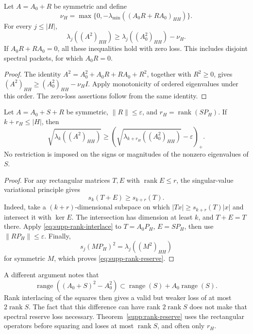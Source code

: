 \begin{proposition}
\label{supp:anticommutator}
Let $A=A_0+R$ be symmetric and define
\[
 \nu_H=\max\{0,-\lambda_{\min}((A_0R+RA_0)_{HH})\}.
\]
For every $j\le|H|$,
\[
 \lambda_j((A^2)_{HH})\ge
       \lambda_j((A_0^2)_{HH})-\nu_H.
\]
If $A_0R+RA_0=0$, all these inequalities hold with zero loss.
This includes disjoint spectral packets, for which $A_0R=0$.
\end{proposition}
\begin{proof}
The identity $A^2=A_0^2+A_0R+RA_0+R^2$, together with
$R^2\ge0$, gives $(A^2)_{HH}\ge(A_0^2)_{HH}-\nu_HI$.
Apply monotonicity of ordered eigenvalues under this order.
The zero-loss assertions follow from the same identity.
\end{proof}

\begin{theorem}
\label{supp:rank-reserve}
Let $A=A_0+S+R$ be symmetric, $\|R\|\le\varepsilon$, and
$r_H=\operatorname{rank}(SP_H)$.  If $k+r_H\le|H|$, then
\begin{equation}\label{eq:supp-rank-reserve}
 \sqrt{\lambda_k((A^2)_{HH})}\ge
 \left(\sqrt{\lambda_{k+r_H}((A_0^2)_{HH})}
                                  -\varepsilon\right)_+.
\end{equation}
No restriction is imposed on the signs or magnitudes of the
nonzero eigenvalues of $S$.
\end{theorem}
\begin{proof}
For any rectangular matrices $T,E$ with $\operatorname{rank}E\le r$,
the singular-value variational principle gives
\begin{equation}\label{eq:supp-rank-interlace}
 s_k(T+E)\ge s_{k+r}(T).
\end{equation}
Indeed, take a $(k+r)$-dimensional subspace on which
$|Tx|\ge s_{k+r}(T)|x|$ and intersect it with $\ker E$.
The intersection has dimension at least $k$, and $T+E=T$ there.
Apply \eqref{eq:supp-rank-interlace} to $T=A_0P_H$, $E=SP_H$,
then use $\|RP_H\|\le\varepsilon$.  Finally,
\[
 s_j(MP_H)^2=\lambda_j((M^2)_{HH})
\]
for symmetric $M$, which proves \eqref{eq:supp-rank-reserve}.
\end{proof}

\begin{remark}
A different argument notes that
\[
 \operatorname{range}((A_0+S)^2-A_0^2)
 \subset \operatorname{range}(S)+A_0\operatorname{range}(S).
\]
Rank interlacing of the squares then gives a valid but weaker loss
of at most $2\operatorname{rank}S$.  The fact that this difference
can have rank $2\operatorname{rank}S$ does not make that spectral
reserve loss necessary.  Theorem~\ref{supp:rank-reserve} uses the
rectangular operators before squaring and loses at most
$\operatorname{rank}S$, and often only $r_H$.
\end{remark}

